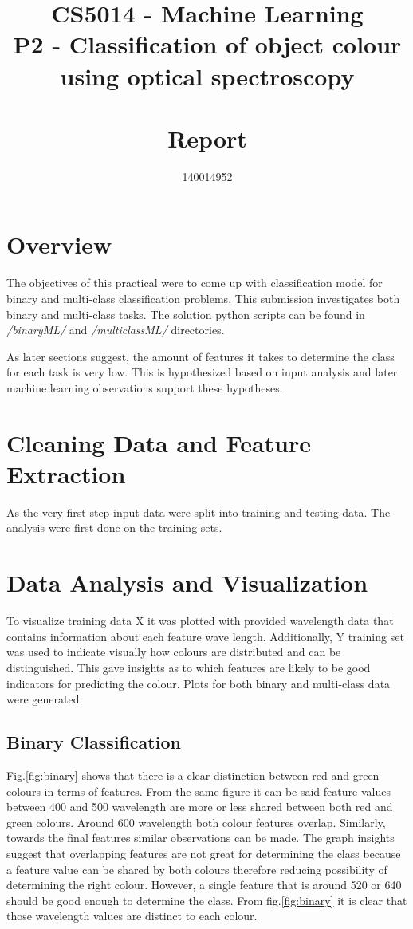 \documentclass[11pt]{article}
\title{CS5014 - Machine Learning 
\\ \vspace{5mm} \Large P2 - Classification of object colour 
\\ using optical spectroscopy 
\\~\\ Report}
\author{140014952}
\begin{document}
	\maketitle

	\section{Overview}
		The objectives of this practical were to come up with classification model for binary and multi-class classification problems. This submission investigates both binary and multi-class tasks. The solution python scripts can be found in \textit{/binaryML/} and \textit{/multiclassML/} directories. 

		As later sections suggest, the amount of features it takes to determine the class for each task is very low. This is hypothesized based on input analysis and later machine learning observations support these hypotheses. 

	\section{Cleaning Data and Feature Extraction}
		As the very first step input data were split into training and testing data. The analysis were first done on the training sets. 
	\section{Data Analysis and Visualization}

		To visualize training data X it was plotted with provided wavelength data that contains information about each feature wave length. Additionally, Y training set was used to indicate visually how colours are distributed and can be distinguished. This gave insights as to which features are likely to be good indicators for predicting the colour. Plots for both binary and multi-class data were generated. 

		\subsection{Binary Classification}
			Fig.\ref{fig:binary} shows that there is a clear distinction between red and green colours in terms of features. From the same figure it can be said feature values between 400 and 500 wavelength are more or less shared between both red and green colours. Around 600 wavelength both colour features overlap. Similarly, towards the final features similar observations can be made. The graph insights suggest that overlapping features are not great for determining the class because a feature value can be shared by both colours therefore reducing possibility of determining the right colour. However, a single feature that is around 520 or 640 should be good enough to determine the class. From fig.\ref{fig:binary} it is clear that those wavelength values are distinct to each colour.
\end{document}
